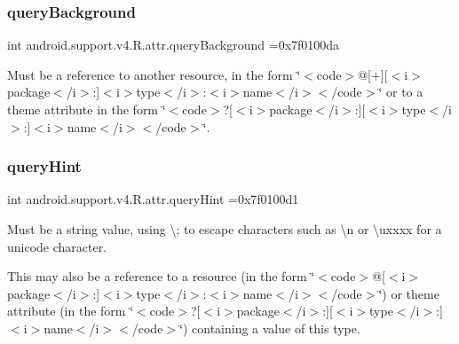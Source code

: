 \subsubsection{\texorpdfstring{query\+Background}{queryBackground}}
{\footnotesize\ttfamily int android.\+support.\+v4.\+R.\+attr.\+query\+Background =0x7f0100da\hspace{0.3cm}{\ttfamily [static]}}

Must be a reference to another resource, in the form \char`\"{}$<$code$>$@\mbox{[}+\mbox{]}\mbox{[}$<$i$>$package$<$/i$>$\+:\mbox{]}$<$i$>$type$<$/i$>$\+:$<$i$>$name$<$/i$>$$<$/code$>$\char`\"{} or to a theme attribute in the form \char`\"{}$<$code$>$?\mbox{[}$<$i$>$package$<$/i$>$\+:\mbox{]}\mbox{[}$<$i$>$type$<$/i$>$\+:\mbox{]}$<$i$>$name$<$/i$>$$<$/code$>$\char`\"{}. \mbox{\label{classandroid_1_1support_1_1v4_1_1R_1_1attr_a3cf01285970a5ede012ca1d4e7982643}} 
\subsubsection{\texorpdfstring{query\+Hint}{queryHint}}
{\footnotesize\ttfamily int android.\+support.\+v4.\+R.\+attr.\+query\+Hint =0x7f0100d1\hspace{0.3cm}{\ttfamily [static]}}

Must be a string value, using \textquotesingle{}\textbackslash{};\textquotesingle{} to escape characters such as \textquotesingle{}\textbackslash{}n\textquotesingle{} or \textquotesingle{}\textbackslash{}uxxxx\textquotesingle{} for a unicode character. 

This may also be a reference to a resource (in the form \char`\"{}$<$code$>$@\mbox{[}$<$i$>$package$<$/i$>$\+:\mbox{]}$<$i$>$type$<$/i$>$\+:$<$i$>$name$<$/i$>$$<$/code$>$\char`\"{}) or theme attribute (in the form \char`\"{}$<$code$>$?\mbox{[}$<$i$>$package$<$/i$>$\+:\mbox{]}\mbox{[}$<$i$>$type$<$/i$>$\+:\mbox{]}$<$i$>$name$<$/i$>$$<$/code$>$\char`\"{}) containing a value of this type. \mbox{\label{classandroid_1_1support_1_1v4_1_1R_1_1attr_a3a741ae2c60e3e084c070a7d57e55f6b}} 
